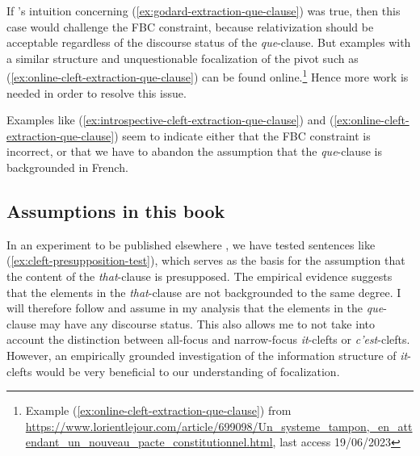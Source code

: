 If \citeauthor{Godard.1988}'s intuition concerning (\ref{ex:godard-extraction-que-clause}) was true, then this case would challenge the FBC constraint, because relativization should be acceptable regardless of the discourse status of the \emph{que}-clause. But examples with a similar structure and unquestionable focalization of the pivot such as (\ref{ex:online-cleft-extraction-que-clause}) can be found online.\footnote{Example (\ref{ex:online-cleft-extraction-que-clause}) from \url{https://www.lorientlejour.com/article/699098/Un\_systeme\_tampon,\_en\_attendant\_un\_nouveau\_pacte\_constitutionnel.html}, last access 19/06/2023}
Hence more work is needed in order to resolve this issue.

\label{ex:online-cleft-extraction-que-clause}
\z 

Examples like (\ref{ex:introspective-cleft-extraction-que-clause}) and (\ref{ex:online-cleft-extraction-que-clause}) seem to indicate either that the FBC constraint is incorrect, or that we have to abandon the assumption that the \emph{que}-clause is backgrounded in French.

\subsection{Assumptions in this book}

In an experiment to be published elsewhere \citep{Winckel.cleft.prep}, we have tested sentences like (\ref{ex:cleft-presupposition-test}), which serves as the basis for the assumption that the content of the \emph{that}-clause is presupposed. The empirical evidence suggests that the elements in the \textit{that}-clause are not backgrounded to the same degree. I will therefore follow \citet{Song.2017} and assume in my analysis that the elements in the \emph{que}-clause may have any discourse status. This also allows me to not take into account the distinction between all-focus and narrow-focus \emph{it}-clefts or \emph{c'est}-clefts. However, an empirically grounded investigation of the information structure of \emph{it}-clefts would be very beneficial to our understanding of focalization. 

